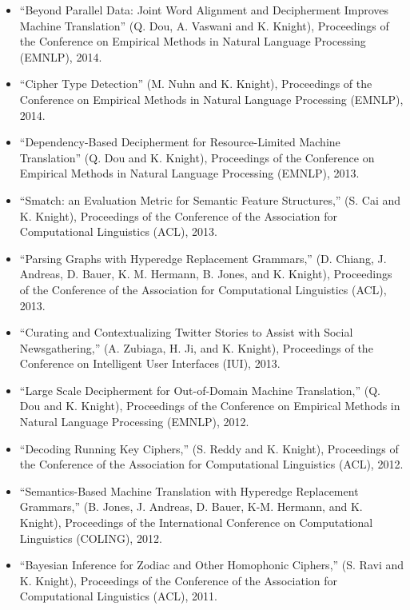 \begin{itemize}
\item ``Beyond Parallel Data: Joint Word Alignment and Decipherment Improves Machine Translation'' (Q. Dou, A. Vaswani and K. Knight), 
Proceedings of the Conference on Empirical Methods in 
Natural Language Processing (EMNLP), 2014.

\item ``Cipher Type Detection'' (M. Nuhn and K. Knight), 
Proceedings of the Conference on Empirical Methods in 
Natural Language Processing (EMNLP), 2014.

\item ``Dependency-Based Decipherment for Resource-Limited Machine Translation'' (Q. Dou and K. Knight), 
Proceedings of the Conference on Empirical Methods in 
Natural Language Processing (EMNLP), 2013.

\item ``Smatch: an Evaluation Metric for Semantic Feature Structures,'' (S. Cai and K. Knight), 
Proceedings of the Conference of the 
Association for Computational Linguistics (ACL), 2013.

\item ``Parsing Graphs with Hyperedge Replacement Grammars,'' (D. Chiang, J. Andreas, D. Bauer, K. M. Hermann, B. Jones, and K. Knight), 
Proceedings of the Conference of the 
Association for Computational Linguistics (ACL), 2013.

\item ``Curating and Contextualizing Twitter Stories to Assist with Social Newsgathering,'' (A. Zubiaga, H. Ji, and K. Knight), 
Proceedings of the Conference on Intelligent User Interfaces (IUI), 2013. 

\item ``Large Scale Decipherment for Out-of-Domain Machine Translation,'' 
(Q. Dou and K. Knight), 
Proceedings of the Conference on Empirical Methods in 
Natural Language Processing (EMNLP), 2012.

\item ``Decoding Running Key Ciphers,'' (S. Reddy and K. Knight), 
Proceedings of the Conference of the 
Association for Computational Linguistics (ACL), 2012.

\item ``Semantics-Based Machine Translation with Hyperedge Replacement Grammars,'' 
(B. Jones, J. Andreas, D. Bauer, K-M. Hermann, and K. Knight), 
Proceedings of the International Conference on Computational
Linguistics (COLING), 2012.

\item ``Bayesian Inference for Zodiac and Other Homophonic Ciphers,''
(S. Ravi and K. Knight),
Proceedings of the Conference of the 
Association for Computational Linguistics (ACL), 2011.


\end{itemize}
